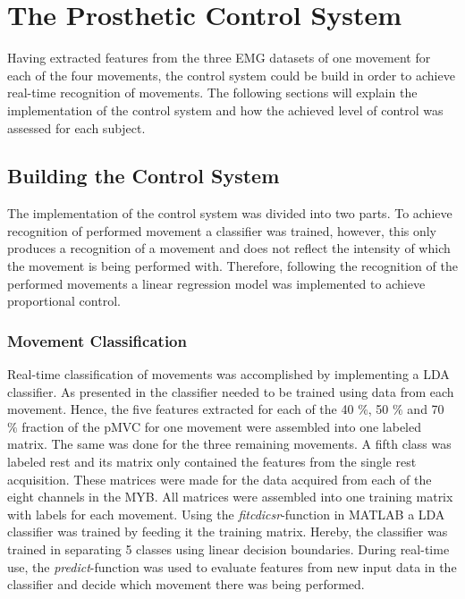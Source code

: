 
\section{The Prosthetic Control System}

Having extracted features from the three EMG datasets of one movement for each of the four movements, the control system could be build in order to achieve real-time recognition of movements. The following sections will explain the implementation of the control system and how the achieved level of control was assessed for each subject. 

\subsection{Building the Control System} 

The implementation of the control system was divided into two parts. To achieve recognition of performed movement a classifier was trained, however, this only produces a recognition of a movement and does not reflect the intensity of which the movement is being performed with. Therefore, following the recognition of the performed movements a linear regression model was implemented to achieve proportional control. 

\subsubsection{Movement Classification}

Real-time classification of movements was accomplished by implementing a LDA classifier. As presented in  the classifier needed to be trained using data from each movement. Hence, the five features extracted for each of the 40 $\percent$, 50 $\percent$ and 70 $\percent$ fraction of the pMVC for one movement were assembled into one labeled matrix. The same was done for the three remaining movements. A fifth class was labeled rest and its matrix only contained the features from the single rest acquisition. These matrices were made for the data acquired from each of the eight channels in the MYB. All matrices were assembled into one training matrix with labels for each movement. Using the \textit{fitcdicsr}-function in MATLAB a LDA classifier was trained by feeding it the training matrix. Hereby, the classifier was trained in separating 5 classes using linear decision boundaries. During real-time use, the \textit{predict}-function was used to evaluate features from new input data in the classifier and decide which movement there was being performed.    


